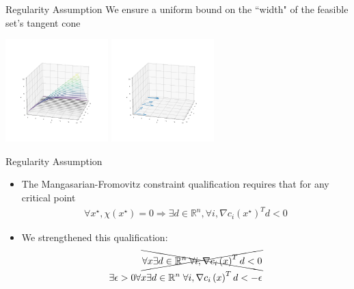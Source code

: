 \documentclass{beamer}
\newcommand{\Rn}{\mathbb R ^ {n}}
\begin{document}
\begin{frame}{Regularity Assumption}
	We ensure a uniform bound on the ``width" of the feasible set's tangent cone
	\begin{center}
		\includegraphics[width=150px]{images/decreasing_regularity.png}
		\includegraphics[width=150px]{images/decreasing_regularity_2.png}
	\end{center}
\end{frame}

\begin{frame}{Regularity Assumption}
\begin{itemize}
\item The Mangasarian-Fromovitz constraint qualification requires that for any critical point 
\begin{align*}
\forall x^{\star}, \chi\left(x^{\star}\right) = 0 
\Longrightarrow \exists d \in \Rn, \forall i, \nabla c_i\left(x^{\star}\right)^T d < 0 
\end{align*}
\item We strengthened this qualification:
\begin{align*}
\xcancel{\forall x \exists d \in \Rn\; \forall i, \nabla c_i\left(x\right)^T d < 0} \\
\exists \epsilon>0 \forall x \exists d \in \Rn\; \forall i, \nabla c_i\left(x\right)^T d < -\epsilon \\
\end{align*}
\end{itemize}
\end{frame}
\end{document}
